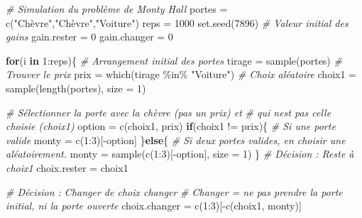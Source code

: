\documentclass[
]{book}
\newenvironment{Shaded}{}{}
\newcommand{\AttributeTok}[1]{#1}
\newcommand{\CommentTok}[1]{\textit{#1}}
\newcommand{\ControlFlowTok}[1]{\textbf{#1}}
\newcommand{\DecValTok}[1]{#1}
\newcommand{\FunctionTok}[1]{#1}
\newcommand{\NormalTok}[1]{#1}
\newcommand{\OtherTok}[1]{#1}
\newcommand{\SpecialCharTok}[1]{#1}
\newcommand{\StringTok}[1]{#1}
\begin{document}
\begin{Shaded}
\begin{Highlighting}[]
\CommentTok{\# Simulation du problème de Monty Hall}
\NormalTok{portes }\OtherTok{=} \FunctionTok{c}\NormalTok{(}\StringTok{"Chèvre"}\NormalTok{,}\StringTok{"Chèvre"}\NormalTok{,}\StringTok{"Voiture"}\NormalTok{)}
\NormalTok{reps }\OtherTok{=} \DecValTok{1000}
\FunctionTok{set.seed}\NormalTok{(}\DecValTok{7896}\NormalTok{)}
\CommentTok{\# Valeur initial des gains}
\NormalTok{gain.rester }\OtherTok{=} \DecValTok{0}
\NormalTok{gain.changer }\OtherTok{=} \DecValTok{0}

\ControlFlowTok{for}\NormalTok{(i }\ControlFlowTok{in} \DecValTok{1}\SpecialCharTok{:}\NormalTok{reps)\{}
  \CommentTok{\# Arrangement initial des portes}
\NormalTok{  tirage }\OtherTok{=} \FunctionTok{sample}\NormalTok{(portes)}
  \CommentTok{\# Trouver le prix}
\NormalTok{  prix }\OtherTok{=} \FunctionTok{which}\NormalTok{(tirage }\SpecialCharTok{\%in\%} \StringTok{"Voiture"}\NormalTok{)}
  \CommentTok{\# Choix aléatoire}
\NormalTok{  choix1 }\OtherTok{=} \FunctionTok{sample}\NormalTok{(}\FunctionTok{length}\NormalTok{(portes), }\AttributeTok{size =} \DecValTok{1}\NormalTok{)}

  \CommentTok{\# Sélectionner la porte avec la chèvre (pas un prix) et}
  \CommentTok{\# qui n\textquotesingle{}est pas celle choisie (choix1)}
\NormalTok{  option }\OtherTok{=} \FunctionTok{c}\NormalTok{(choix1, prix)}
  \ControlFlowTok{if}\NormalTok{(choix1 }\SpecialCharTok{!=}\NormalTok{ prix)\{}
    \CommentTok{\# Si une porte valide}
\NormalTok{    monty }\OtherTok{=} \FunctionTok{c}\NormalTok{(}\DecValTok{1}\SpecialCharTok{:}\DecValTok{3}\NormalTok{)[}\SpecialCharTok{{-}}\NormalTok{option]}
\NormalTok{  \}}\ControlFlowTok{else}\NormalTok{\{}
    \CommentTok{\# Si deux portes valides, en choisir une aléatoirement.}
\NormalTok{    monty }\OtherTok{=} \FunctionTok{sample}\NormalTok{(}\FunctionTok{c}\NormalTok{(}\DecValTok{1}\SpecialCharTok{:}\DecValTok{3}\NormalTok{)[}\SpecialCharTok{{-}}\NormalTok{option], }\AttributeTok{size =} \DecValTok{1}\NormalTok{)}
\NormalTok{  \}}
  \CommentTok{\# Décision : Reste à choix1}
\NormalTok{  choix.rester }\OtherTok{=}\NormalTok{ choix1}

  \CommentTok{\# Décision : Changer de choix changer}
  \CommentTok{\# Changer = ne pas prendre la porte initial, ni la porte ouverte}
\NormalTok{  choix.changer }\OtherTok{=} \FunctionTok{c}\NormalTok{(}\DecValTok{1}\SpecialCharTok{:}\DecValTok{3}\NormalTok{)[}\SpecialCharTok{{-}}\FunctionTok{c}\NormalTok{(choix1, monty)]}


\end{Highlighting}
\end{Shaded}
\end{document}

